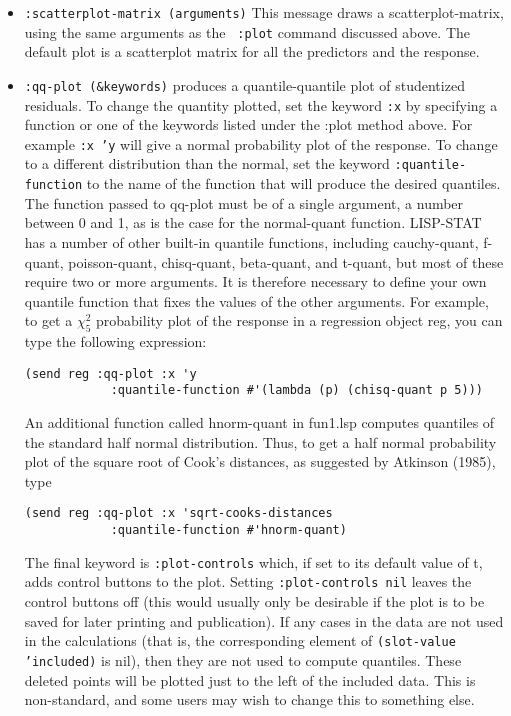 \begin{itemize}
\item {\tt :scatterplot-matrix (arguments)}
This message draws a scatterplot-matrix, using the same arguments as the {\tt
:plot} command discussed above.  The default plot is a scatterplot matrix for
all the predictors and the response.
\item {\tt :qq-plot (\&keywords)} produces a quantile-quantile plot of
studentized residuals.  To change the quantity plotted, set the keyword
{\tt :x} by specifying a function or one of the keywords listed under the
:plot method above.  For example {\tt :x 'y} will give a normal probability 
plot of the response.  To change to a different distribution than 
the normal, set the keyword
{\tt :quantile-function} to the name of the
function that will produce the desired
quantiles.  The function passed to qq-plot must be of a single argument,
a number between 0 and 1, as is the case for the normal-quant
function.  LISP-STAT has a number of other built-in quantile functions, 
including
cauchy-quant, f-quant, poisson-quant, chisq-quant, beta-quant, and t-quant, but
most of these require two or more arguments.  It is therefore necessary to
define your own quantile function that fixes the values of the other
arguments.
For example, to get a $\chi^2_5$ probability plot of the response in a
regression object reg, you can type the following expression:
\begin{verbatim}
(send reg :qq-plot :x 'y 
            :quantile-function #'(lambda (p) (chisq-quant p 5)))
\end{verbatim}
An additional function called hnorm-quant in fun1.lsp computes 
quantiles of the standard half
normal distribution.  Thus, to get a half normal probability plot of the
square root of Cook's distances, as suggested by Atkinson (1985), type
\begin{verbatim}
(send reg :qq-plot :x 'sqrt-cooks-distances
            :quantile-function #'hnorm-quant)
\end{verbatim}
The final keyword is {\tt :plot-controls} which, if set to its default
value of t, adds control buttons to the plot.  Setting {\tt :plot-controls nil}
leaves the control buttons off (this would usually only be desirable if the
plot is to be saved for later printing and publication).  
If any cases in the data are not used in 
the calculations (that is, the corresponding element 
of {\tt (slot-value 'included)} is nil), then they are not used to compute 
quantiles.  These deleted points will be plotted just to the left of the 
included data.  This is non-standard, and some users may wish to change this
to something else.


\end{itemize}
